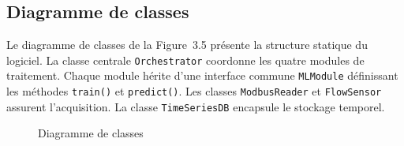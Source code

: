 
\subsection{Diagramme de classes}

Le diagramme de classes de la Figure~3.5 présente la structure statique du logiciel. La classe centrale \texttt{Orchestrator} coordonne les quatre modules de traitement. Chaque module hérite d'une interface commune \texttt{MLModule} définissant les méthodes \texttt{train()} et \texttt{predict()}. Les classes \texttt{ModbusReader} et \texttt{FlowSensor} assurent l'acquisition. La classe \texttt{TimeSeriesDB} encapsule le stockage temporel.

\begin{figure}[htbp]
  \centering
  \caption{Diagramme de classes}
\end{figure}


